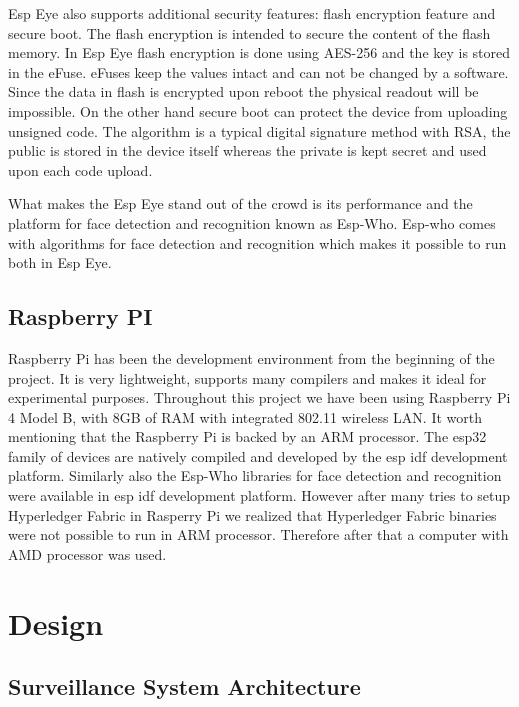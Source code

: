 Esp Eye also supports additional security features: flash encryption feature and secure boot. The flash encryption is intended to secure the content of the flash memory. In Esp Eye flash encryption is done using AES-256 and the key is stored in the eFuse. eFuses keep the values intact and can not be changed by a software. Since the data in flash is encrypted upon reboot the physical readout will be impossible. 
On the other hand secure boot can protect the device from uploading unsigned code. The algorithm is a typical digital signature method with RSA, the public is stored in the device itself whereas the private is kept secret and used upon each code upload. 

What makes the Esp Eye stand out of the crowd is its performance and the platform for face detection and recognition known as Esp-Who. Esp-who comes with algorithms for face detection and recognition which makes it possible to run both in Esp Eye.

\subsection{Raspberry PI}

Raspberry Pi has been the development environment from the beginning of the project. It is very lightweight, supports many compilers and makes it ideal for experimental purposes. Throughout this project we have been using Raspberry Pi 4 Model B, with 8GB of RAM with  integrated 802.11 wireless LAN. It worth mentioning that the Raspberry Pi is backed by an ARM processor. 
The esp32 family of devices are natively compiled and developed by the esp idf development platform.  Similarly also the Esp-Who libraries for face detection and recognition were available in esp idf development platform.
However after many tries to setup Hyperledger Fabric in Rasperry Pi we realized that Hyperledger Fabric binaries were not possible to run in ARM processor. Therefore after that a computer with AMD processor was used. 






\section{Design}

 


\subsection{Surveillance System Architecture}


